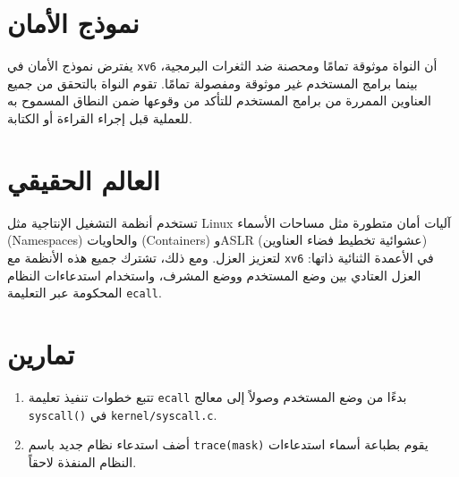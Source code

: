\section{نموذج الأمان}
\label{sec:security_model}

يفترض نموذج الأمان في \texttt{xv6} أن النواة موثوقة تمامًا ومحصنة ضد الثغرات البرمجية، بينما برامج المستخدم غير موثوقة ومفصولة تمامًا. تقوم النواة بالتحقق من جميع العناوين الممررة من برامج المستخدم للتأكد من وقوعها ضمن النطاق المسموح به للعملية قبل إجراء القراءة أو الكتابة.

\section{العالم الحقيقي}
\label{sec:real_world_first}

تستخدم أنظمة التشغيل الإنتاجية مثل Linux آليات أمان متطورة مثل مساحات الأسماء (Namespaces) والحاويات (Containers) وASLR (عشوائية تخطيط فضاء العناوين) لتعزيز العزل. ومع ذلك، تشترك جميع هذه الأنظمة مع \texttt{xv6} في الأعمدة الثنائية ذاتها: العزل العتادي بين وضع المستخدم ووضع المشرف، واستخدام استدعاءات النظام المحكومة عبر التعليمة \texttt{ecall}.

\section{تمارين}
\label{sec:exercises_first}

\begin{enumerate}
  \item تتبع خطوات تنفيذ تعليمة \texttt{ecall} بدءًا من وضع المستخدم وصولاً إلى معالج \texttt{syscall()} في \texttt{kernel/syscall.c}.
  \item أضف استدعاء نظام جديد باسم \texttt{trace(mask)} يقوم بطباعة أسماء استدعاءات النظام المنفذة لاحقاً.
\end{enumerate}
